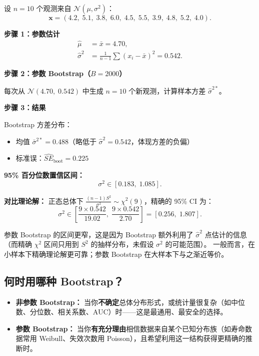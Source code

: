 \begin{example}
设 $n = 10$ 个观测来自 $\mathcal{N}(\mu, \sigma^2)$：
\begin{equation}
    \bm{x} = (4.2,\; 5.1,\; 3.8,\; 6.0,\; 4.5,\; 5.5,\; 3.9,\; 4.8,\; 5.2,\; 4.0).
\end{equation}

\medskip
\textbf{步骤 1：参数估计}
\begin{align}
    \hat{\mu} &= \bar{x} = 4.70, \\
    \hat{\sigma}^2 &= \frac{1}{n-1}\sum (x_i - \bar{x})^2 = 0.542.
\end{align}

\textbf{步骤 2：参数 Bootstrap（$B = 2000$）}

每次从 $\mathcal{N}(4.70,\; 0.542)$ 中生成 $n=10$ 个新观测，计算样本方差 $\hat{\sigma}^{2*}$。

\textbf{步骤 3：结果}

Bootstrap 方差分布：
\begin{itemize}
    \item 均值 $\bar{\sigma}^{2*} = 0.488$（略低于 $\hat{\sigma}^2 = 0.542$，体现方差的负偏）
    \item 标准误：$\widehat{SE}_{\text{boot}} = 0.225$
\end{itemize}

\textbf{95\% 百分位数置信区间：}
\begin{equation}
    \sigma^2 \in [0.183,\; 1.085].
\end{equation}

\textbf{对比理论解：}
正态总体下 $\frac{(n-1)S^2}{\sigma^2} \sim \chi^2(9)$，精确的 95\% CI 为：
\begin{equation}
    \sigma^2 \in \left[\frac{9 \times 0.542}{19.02},\; \frac{9 \times 0.542}{2.70}\right]
    = [0.256,\; 1.807].
\end{equation}

参数 Bootstrap 的区间更窄，这是因为 Bootstrap 额外利用了 $\hat{\sigma}^2$ 点估计的信息
（而精确 $\chi^2$ 区间只用到 $S^2$ 的抽样分布，未假设 $\sigma^2$ 的可能范围）。
一般而言，在小样本下精确理论解更可靠；参数 Bootstrap 在大样本下与之渐近等价。
\end{example}

\subsection{何时用哪种 Bootstrap？}

\begin{itemize}
    \item \textbf{非参数 Bootstrap：} 当你\textbf{不确定}总体分布形式，或统计量很复杂（如中位数、分位数、相关系数、AUC）时——这是最通用、最安全的选择。
    \item \textbf{参数 Bootstrap：} 当你\textbf{有充分理由}相信数据来自某个已知分布族（如寿命数据常用 Weibull、失效次数用 Poisson），且希望利用这一结构获得更精确的推断时。
\end{itemize}

